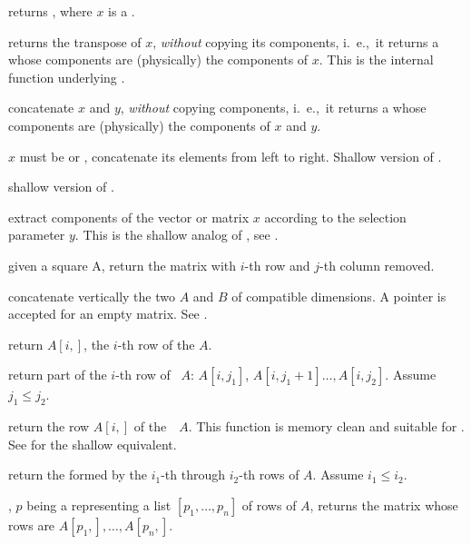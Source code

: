  returns , where $x$
is a .

 returns the transpose of $x$, \emph{without}
copying its components, i.~e.,~it returns a  whose components are
(physically) the components of $x$. This is the internal function underlying
.

 concatenate $x$ and $y$, \emph{without}
copying components, i.~e.,~it returns a  whose components are
(physically) the components of $x$ and $y$.

$x$ must be  or , concatenate
its elements from left to right. Shallow version of .

 shallow version of .

 extract components
of the vector or matrix $x$ according to the selection parameter $y$.
This is the shallow analog of , see .

 given a square  A,
return the matrix with $i$-th row and $j$-th column removed.

 concatenate vertically the two  $A$
and $B$ of compatible dimensions. A  pointer is accepted for an
empty matrix. See .

 return $A[i,]$, the $i$-th row of the 
$A$.

 return part of the $i$-th
row of ~$A$: $A[i,j_1]$, $A[i,j_1+1]\dots,A[i,j_2]$. Assume $j_1
\leq j_2$.

 return the row $A[i,]$ of
the~~$A$. This function is memory clean and suitable for
. See  for the shallow equivalent.

 return the 
formed by the $i_1$-th through $i_2$-th rows of  $A$. Assume $i_1
\leq i_2$.

, $p$ being a 
representing a list $[p_1,\dots,p_n]$ of rows of  $A$, returns the
matrix whose rows are $A[p_1,],\dots, A[p_n,]$.


